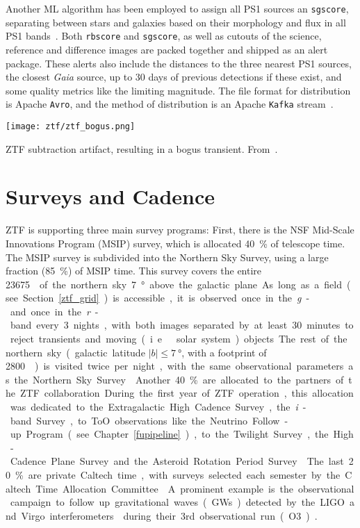 Another ML algorithm has been employed to assign all PS1 sources an \texttt{sgscore}, separating between stars and galaxies based on their morphology and flux in all PS1 bands~. Both \texttt{rbscore} and \texttt{sgscore}, as well as cutouts of the science, reference and difference images are packed together and shipped as an alert package. These alerts also include the distances to the three nearest PS1 sources, the closest \textit{Gaia} source, up to 30 days of previous detections if these exist, and some quality metrics like the limiting magnitude. The file format for distribution is Apache \texttt{Avro}, and the method of distribution is an Apache \texttt{Kafka} stream~.

\begin{marginfigure}
    \texttt{[image: ztf/ztf\_bogus.png]}
    \caption[ZTF subtraction artifact]{ZTF subtraction artifact, resulting in a bogus transient. From~\cite{Mahabal2019}.}
\end{marginfigure}

\section{Surveys and Cadence}\label{surveys}
ZTF is supporting three main survey programs: First, there is the NSF Mid-Scale Innovations Program (MSIP) survey, which is allocated \SI{40}{\percent} of telescope time. The MSIP survey is subdivided into the Northern Sky Survey, using a large fraction (\SI{85}{\percent}) of MSIP time. This survey covers the entire \SI{23675}{\square\deg} of the northern sky \SI{7}{\degree} above the galactic plane. As long as a field (see Section~\ref{ztf_grid}) is accessible, it is observed once in the \textit{g}- and once in the \textit{r}-band every 3 nights, with both images separated by at least 30 minutes to reject transients and moving (i.e.\ solar system) objects. The rest of the northern sky (galactic latitude $|b|\leq \SI{7}{\degree}$, with a footprint of \SI{2800}{\square\deg}) is visited twice per night, with the same observational parameters as the Northern Sky Survey~\cite{Bellm2019a}.

Another \SI{40}{\percent} are allocated to the partners of the ZTF collaboration. During the first year of ZTF operation, this allocation was dedicated to the Extragalactic High Cadence Survey, the \textit{i}-band Survey, to ToO observations like the Neutrino Follow-up Program (see Chapter~\ref{fupipeline}), to the Twilight Survey, the High-Cadence Plane Survey and the Asteroid Rotation Period Survey~\cite{Bellm2019a}.

The last \SI{20}{\percent} are private Caltech time, with surveys selected each semester by the Caltech Time Allocation Committee~\cite{Bellm2019a}. A prominent example is the observational campaign to follow up gravitational waves (GWs) detected by the LIGO and Virgo interferometers~ during their 3rd observational run (O3)~.